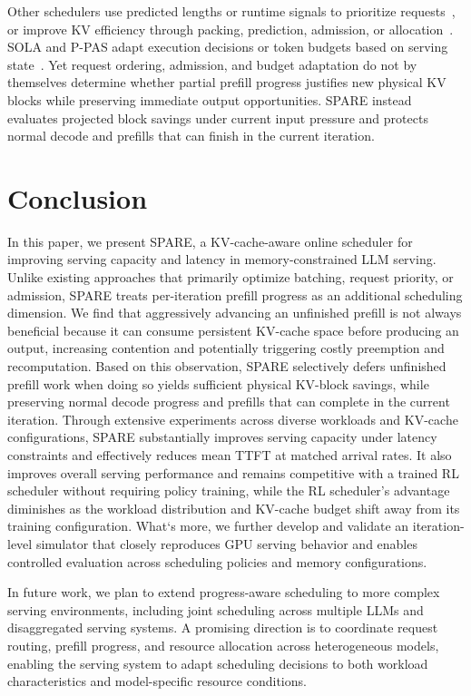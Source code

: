 \documentclass[sigconf,anonymous,review]{acmart}
\begin{document}
Other schedulers use predicted lengths or runtime signals to prioritize requests~\cite{intro_ltr,intro_trail,intro_tie,intro_uniboost}, or improve KV efficiency through packing, prediction, admission, or allocation~\cite{intro_s3,intro_pastfuture,intro_aptserve,intro_onlinekv,rw_vattention2025}. SOLA and P-PAS adapt execution decisions or token budgets based on serving state~\cite{intro_sola,saemann2026ppas}. Yet request ordering, admission, and budget adaptation do not by themselves determine whether partial prefill progress justifies new physical KV blocks while preserving immediate output opportunities. SPARE instead evaluates projected block savings under current input pressure and protects normal decode and prefills that can finish in the current iteration.


\section{Conclusion}

In this paper, we present SPARE, a KV-cache-aware online scheduler for improving serving capacity and latency in memory-constrained LLM serving. Unlike existing approaches that primarily optimize batching, request priority, or admission, SPARE treats per-iteration prefill progress as an additional scheduling dimension. We find that aggressively advancing an unfinished prefill is not always beneficial because it can consume persistent KV-cache space before producing an output, increasing contention and potentially triggering costly preemption and recomputation. Based on this observation, SPARE selectively defers unfinished prefill work when doing so yields sufficient physical KV-block savings, while preserving normal decode progress and prefills that can complete in the current iteration. Through extensive experiments across diverse workloads and KV-cache configurations, SPARE substantially improves serving capacity under latency constraints and effectively reduces mean TTFT at matched arrival rates. It also improves overall serving performance and remains competitive with a trained RL scheduler without requiring policy training, while the RL scheduler's advantage diminishes as the workload distribution and KV-cache budget shift away from its training configuration. What‘s more, we further develop and validate an iteration-level simulator that closely reproduces GPU serving behavior and enables controlled evaluation across scheduling policies and memory configurations.

In future work, we plan to extend progress-aware scheduling to more complex serving environments, including joint scheduling across multiple LLMs and disaggregated serving systems. A promising direction is to coordinate request routing, prefill progress, and resource allocation across heterogeneous models, enabling the serving system to adapt scheduling decisions to both workload characteristics and model-specific resource conditions.




\appendix

\clearpage
\end{document}
